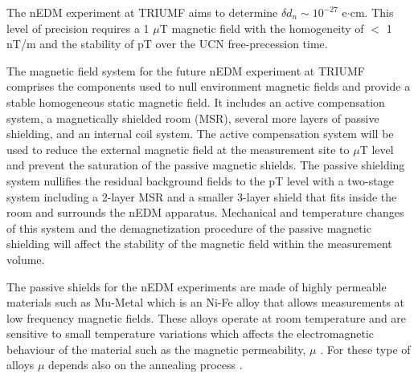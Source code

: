 \documentclass[review]{elsarticle}
\begin{document}
The nEDM experiment at TRIUMF aims to determine $\delta d_n \sim
10^{-27}$ e$\cdot$cm. This level of precision requires a 1 $\mu$T
magnetic field with the homogeneity of $<$ 1 nT/m and the stability of
pT over the UCN free-precession time.

% 
%

The magnetic field system for the future nEDM experiment at TRIUMF comprises the components used to null environment magnetic fields and provide a stable homogeneous static magnetic field. It includes an active compensation system, a magnetically shielded room (MSR), several more layers of passive shielding, and  an internal coil system.
The active compensation system will be used to reduce the external magnetic field at the measurement site to $\mu$T level and prevent the saturation of the passive magnetic shields.
The passive shielding system nullifies the residual background fields to the pT level with a two-stage system including a 2-layer MSR and a smaller 3-layer shield that fits inside the room and surrounds the nEDM apparatus.
Mechanical and temperature changes of this system and the demagnetization procedure of the passive magnetic shielding will affect the stability of the magnetic field within the measurement volume\cite{bib:thiel,bib:altarev2014,bib:altarev2015,bib:voigt}.

%
%

%
%

%
%


The passive shields for the nEDM experiments are made of highly
permeable materials such as Mu-Metal which is an Ni-Fe alloy that
allows measurements at low frequency magnetic fields. These alloys
operate at room temperature and are sensitive to small temperature
variations which affects the electromagnetic behaviour of the material
such as the magnetic permeability, $\mu$ \cite{bib:couderchon,bib:kruppvdm}. For
these type of alloys $\mu$ depends also on the annealing process
\cite{bib:gupta,bib:bozorth}. 
\end{document}
